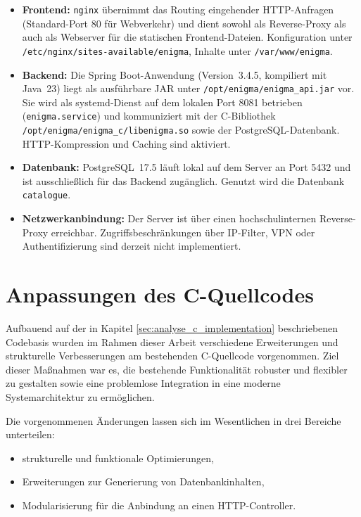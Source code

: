 \documentclass[12pt, ngerman, a4paper, numbers=noenddot]{article}
\begin{document}
\begin{itemize}
	\item \textbf{Frontend:} \lstinline|nginx| übernimmt das Routing eingehender HTTP-Anfragen (Stan\-dard-Port 80 für Webverkehr) und dient sowohl als Reverse-Proxy als auch als Webserver für die statischen Frontend-Dateien. Konfiguration unter \lstinline|/etc/nginx/sites-available/enigma|, Inhalte unter \lstinline|/var/www/enigma|.	
	
	\item \textbf{Backend:} Die Spring Boot-Anwendung (Version~3.4.5, kompiliert mit Java~23) liegt als ausführbare JAR unter \lstinline|/opt/enigma/enigma_api.jar| vor. Sie wird als systemd-Dienst auf dem lokalen Port 8081 betrieben (\lstinline|enigma.service|) und kommuniziert mit der C-Bibliothek \lstinline|/opt/enigma/enigma_c/libenigma.so| sowie der PostgreSQL-Datenbank. HTTP-Kompression und Caching sind aktiviert.
	
	\item \textbf{Datenbank:} PostgreSQL~17.5 läuft lokal auf dem Server an Port 5432 und ist ausschließlich für das Backend zugänglich. Genutzt wird die Datenbank \lstinline|catalogue|.
	
	\item \textbf{Netzwerkanbindung:} Der Server ist über einen hochschulinternen Reverse-Proxy erreichbar. Zugriffsbeschränkungen über IP-Filter, VPN oder Authentifizierung sind derzeit nicht implementiert.
\end{itemize}


\newpage
\section{Anpassungen des C-Quellcodes}
\label{sec:c_modifications}

Aufbauend auf der in Kapitel \ref{sec:analyse_c_implementation} beschriebenen Codebasis wurden im Rahmen dieser Arbeit verschiedene Erweiterungen und strukturelle Verbesserungen am bestehenden C-Quellcode vorgenommen. Ziel dieser Maßnahmen war es, die bestehende Funktionalität robuster und flexibler zu gestalten sowie eine problemlose Integration in eine moderne Systemarchitektur zu ermöglichen.

Die vorgenommenen Änderungen lassen sich im Wesentlichen in drei Bereiche unterteilen:
\begin{itemize}
	\item strukturelle und funktionale Optimierungen,
	\item Erweiterungen zur Generierung von Datenbankinhalten,
	\item Modularisierung für die Anbindung an einen HTTP-Controller.
\end{itemize}
\end{document}
